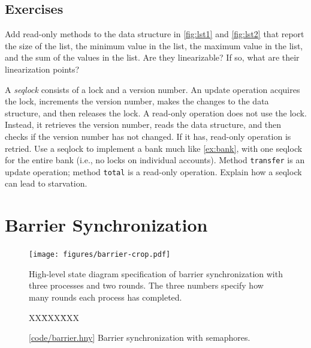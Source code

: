\documentclass{report}
\newcommand{\harmonysource}[1]{
\begin{tabbing}
XX\=XXX\=XXX\kill
    
\end{tabbing}
}
\newcommand{\harmonylink}[1]{%
[\href{https://www.cs.cornell.edu/home/rvr/harmony/#1}{\underline{#1}}]%
}
\newenvironment{code}{
\tcolorbox
}{
\endtcolorbox
}
\begin{document}
\section*{Exercises}
\begin{problems}
\item Add read-only methods to the data structure in \autoref{fig:lst1}
and \autoref{fig:lst2} that report the size of the list, the minimum value in the
list, the maximum value in the list, and the sum of the values in the list.
Are they linearizable?  If so, what are their linearization points?
\item A \emph{seqlock}
%
consists of a lock and a version number.
An update operation acquires the lock, increments the version number, makes the
changes to the data structure, and then releases the lock.  A read-only operation
does not use the lock.  Instead, it retrieves the version number,
reads the data structure, and then checks if the
version number has not changed.  If it has, read-only operation is retried.
Use a seqlock to implement a bank much like \autoref{ex:bank}, with
one seqlock for the entire bank (i.e., no locks on individual accounts).
Method \texttt{transfer} is an update operation; method \texttt{total} is a
read-only operation.  Explain how a seqlock can lead to starvation.
\end{problems}

\chapter{Barrier Synchronization}
\label{ch:barrier}
%

%

\begin{figure}
\begin{center}
\texttt{[image: figures/barrier-crop.pdf]}
\end{center}
\caption{High-level state diagram specification of barrier synchronization
with three processes and two rounds.  The three numbers specify how many
rounds each process has completed.}
\label{fig:barrierdiagram}
\end{figure}

\begin{figure}
\begin{code}
\harmonysource{barrier}
\end{code}
\caption{\harmonylink{code/barrier.hny} Barrier synchronization with semaphores.}
\label{fig:barrier}
\end{figure}
\end{document}
